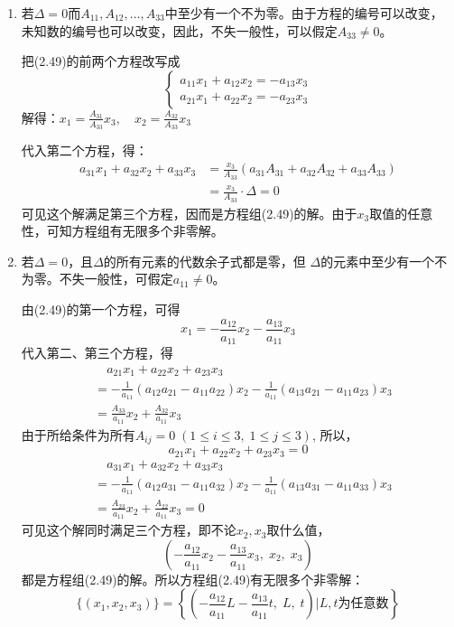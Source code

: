 \begin{enumerate}
    \item 若$\Delta=0$而$A_{11},A_{12},\ldots,A_{33}$中至少有一个不为零。由于方程的编号可以改变，未知数的编号也可以改变，因此，不失一般性，可以假定$A_{33}\ne 0$。
    
    把(2.49)的前两个方程改写成
\[\begin{cases}
    a_{11}x_1+a_{12}x_2=-a_{13}x_3\\
    a_{21}x_1+a_{22}x_2=-a_{23}x_3
\end{cases}\]
解得：$x_1=\frac{A_{31}}{A_{33}}x_3,\quad x_2=\frac{A_{32}}{A_{33}}x_3$

代入第二个方程，得：
\[\begin{split}
    a_{31}x_1+a_{32}x_2+a_{33}x_3&=\frac{x_3}{A_{33}}(a_{31}A_{31}+a_{32}A_{32}+a_{33}A_{33})\\
    &=\frac{x_3}{A_{33}}\cdot \Delta =0
\end{split}\]
可见这个解满足第三个方程，因而是方程组(2.49)的解。由于$x_3$取值的任意性，可知方程组有无限多个非零解。

\item 若$\Delta=0$，且$\Delta$的所有元素的代数余子式都是零，但
$\Delta$的元素中至少有一个不为零。不失一般性，可假定$a_{11}\ne 0$。

由(2.49)的第一个方程，可得
\[x_1=-\frac{a_{12}}{a_{11}}x_2-\frac{a_{13}}{a_{11}}x_3\]
代入第二、第三个方程，得
\[\begin{split}
   &\quad  a_{21}x_1+a_{22}x_2+a_{23}x_3\\
   &=-\frac{1}{a_{11}}(a_{12}a_{21}-a_{11}a_{22})x_2-\frac{1}{a_{11}}(a_{13}a_{21}-a_{11}a_{23})x_3\\
   &=\frac{A_{33}}{a_{11}}x_2+\frac{A_{32}}{a_{11}}x_3
\end{split}\]
由于所给条件为所有$A_{ij}=0\; (1\le i\le 3,\;  1\le j\le 3)$, 所以，
\[a_{21}x_1+a_{22}x_2+a_{23}x_3=0\]
\[\begin{split}
    &\quad a_{31}x_1+a_{32}x_2+a_{33}x_3\\
&=-\frac{1}{a_{11}}(a_{12}a_{31}-a_{11}a_{32})x_2-\frac{1}{a_{11}}(a_{13}a_{31}-a_{11}a_{33})x_3\\
&=\frac{A_{23}}{a_{11}}x_2+\frac{A_{22}}{a_{11}}x_3=0
\end{split}\]
可见这个解同时满足三个方程，即不论$x_2,x_3$取什么值，$$\left(-\frac{a_{12}}{a_{11}}x_2-\frac{a_{13}}{a_{11}}x_3,\; x_2,\; x_3\right)$$
都是方程组(2.49)的解。所以方程组(2.49)有无限多个非零解：
\[\{(x_1,x_2,x_3)\}=\left\{\left(-\frac{a_{12}}{a_{11}}L-\frac{a_{13}}{a_{11}}t,\; L,\; t\right)\big| \text{$L,t$为任意数}\right\}\]
\end{enumerate}

